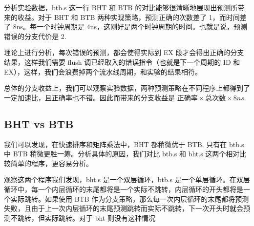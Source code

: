 \documentclass{article}
\begin{document}
分析实验数据，btb.s 这一行 BHT 和 BTB 的对比能够很清晰地展现出预测所带来的收益。对于 BHT 和 BTB 两种实现策略，预测正确的次数差了 1，而时间差了 8ns。每一个时钟周期是 4ns，这刚好是两个时钟周期的时间。也就是说，预测错误的分支代价是 2.

理论上进行分析，每次错误的预测，都会使得实际到 EX 段才会得出正确的分支结果，这样我们需要 flush 调已经取入的错误指令（也就是下一个周期的 ID 和 EX），这样，我们会浪费掉两个流水线周期，和实验的结果相符。

总体的分支收益上，我们可以观察实验数据，两种预测策略在不同程序上都得到了一定加速比，且正确率也不错。因此而带来的分支收益是 $正确率 \times 总次数 \times 8ns$.

\subsection{BHT vs BTB}
我们可以发现，在快速排序和矩阵乘法中，BHT 都稍微优于 BTB. 只有在 btb.s 中 BTB 稍微更胜一筹。分析具体的原因，我们对比 btb.s 和 bht.s 这两个相对比较简单的程序，更容易分析。

观察这两个程序我们发现，bht.s 是一个双层循环，btb.s 是一个单层循环。在双层循环中，每一个内层循环的末尾都将是一个实际不跳转，内层循环的开头都将是一个实际跳转。如果使用 BTB 作为分支策略，那么每一次内层循环的末尾都将预测失败，且由于上一次内层循环的末尾预测跳转而实际不跳转，下一次开头时就会预测不跳转，但实际跳转。对于 bht 则没有这种情况
\end{document}
